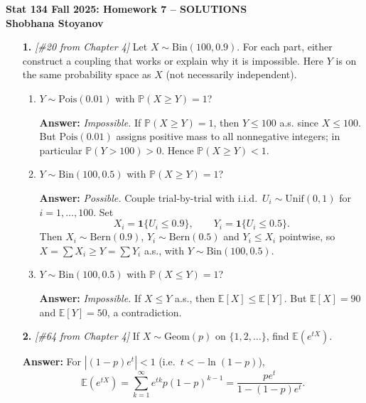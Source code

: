 \documentclass[11pt]{article}
\begin{document}
\begin{center}
{\Large \textbf{Stat 134 Fall 2025: Homework 7 -- SOLUTIONS}}\\[6pt]
\textbf{Shobhana Stoyanov}\\[2pt]
\end{center}

\bigskip

\begin{enumerate}

\item[\textbf{1.}] \emph{[\#20 from Chapter 4]}
Let $X \sim \mathrm{Bin}(100,0.9)$. For each part, either construct a coupling that works or explain why it is impossible. Here $Y$ is on the same probability space as $X$ (not necessarily independent).

\begin{enumerate}[label=(\alph*)]
\item $Y \sim \mathrm{Pois}(0.01)$ with $\mathbb{P}(X \ge Y)=1$?

\textbf{Answer:} \emph{Impossible.} If $\mathbb{P}(X \ge Y)=1$, then $Y \le 100$ a.s. since $X \le 100$. But $\mathrm{Pois}(0.01)$ assigns positive mass to all nonnegative integers; in particular $\mathbb{P}(Y>100)>0$. Hence $\mathbb{P}(X \ge Y)<1$.

\item $Y \sim \mathrm{Bin}(100,0.5)$ with $\mathbb{P}(X \ge Y)=1$?

\textbf{Answer:} \emph{Possible.} Couple trial-by-trial with i.i.d.\ $U_i \sim \mathrm{Unif}(0,1)$ for $i=1,\dots,100$. Set
\[
X_i=\mathbf{1}\{U_i \le 0.9\},\qquad Y_i=\mathbf{1}\{U_i \le 0.5\}.
\]
Then $X_i \sim \mathrm{Bern}(0.9)$, $Y_i \sim \mathrm{Bern}(0.5)$ and $Y_i \le X_i$ pointwise, so $X=\sum X_i \ge Y=\sum Y_i$ a.s., with $Y \sim \mathrm{Bin}(100,0.5)$.

\item $Y \sim \mathrm{Bin}(100,0.5)$ with $\mathbb{P}(X \le Y)=1$?

\textbf{Answer:} \emph{Impossible.} If $X \le Y$ a.s., then $\mathbb{E}[X] \le \mathbb{E}[Y]$. But $\mathbb{E}[X]=90$ and $\mathbb{E}[Y]=50$, a contradiction.
\end{enumerate}

\item[\textbf{2.}] \emph{[\#64 from Chapter 4]}
If $X \sim \mathrm{Geom}(p)$ on $\{1,2,\dots\}$, find $\mathbb{E}(e^{tX})$.

\textbf{Answer:} For $| (1-p)e^t | < 1$ (i.e.\ $t < -\ln(1-p)$),
\[
\mathbb{E}\!\left(e^{tX}\right)=\sum_{k=1}^{\infty} e^{tk} p(1-p)^{k-1}
= \frac{p e^{t}}{1-(1-p)e^{t}}.
\]


\end{enumerate}
\end{document}
